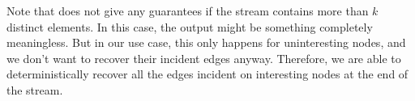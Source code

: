 \documentclass[10pt,a4paper]{article}
\newcommand{\truncatedpivot}{\textrm{Truncated-Pivot}\xspace}
\newcommand{\eps}{\ensuremath{\varepsilon}}
\begin{document}
{Note that  does not give any guarantees if the stream contains more than $k$ distinct elements. In this case, the output might be something completely meaningless. But in our use case, this only happens for uninteresting nodes, and we don't want to recover their incident edges anyway. Therefore, we are able to deterministically recover all the edges incident on interesting nodes at the end of the stream.


}
\end{document}
